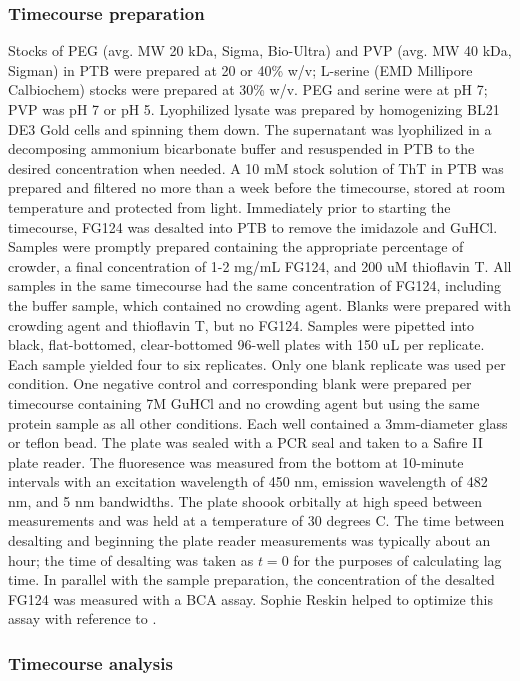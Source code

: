 \subsubsection{Timecourse preparation} Stocks of PEG (avg. MW 20 kDa, Sigma, Bio-Ultra) and PVP (avg. MW 40 kDa, Sigman) in PTB were prepared at 20 or 40\% w/v; L-serine (EMD Millipore Calbiochem) stocks were prepared at 30\% w/v.  PEG and serine were at pH 7; PVP was pH 7 or pH 5.  Lyophilized lysate was prepared by homogenizing BL21 DE3 Gold cells and spinning them down.  The supernatant was lyophilized in a decomposing ammonium bicarbonate buffer and resuspended in PTB to the desired concentration when needed.  A 10 mM stock solution of ThT in PTB was prepared and filtered no more than a week before the timecourse, stored at room temperature and protected from light.  Immediately prior to starting the timecourse, FG124 was desalted into PTB to remove the imidazole and GuHCl.  Samples were promptly prepared containing the appropriate percentage of crowder, a final concentration of 1-2 mg/mL FG124, and 200 uM thioflavin T.  All samples in the same timecourse had the same concentration of FG124, including the buffer sample, which contained no crowding agent.  Blanks were prepared with crowding agent and thioflavin T, but no FG124.  Samples were pipetted into black, flat-bottomed, clear-bottomed 96-well plates with 150 uL per replicate.  Each sample yielded four to six replicates.  Only one blank replicate was used per condition.  One negative control and corresponding blank were prepared per timecourse containing 7M GuHCl and no crowding agent but using the same protein sample as all other conditions.  Each well contained a 3mm-diameter glass or teflon bead.  The plate was sealed with a PCR seal and taken to a Safire II plate reader.  The fluoresence was measured from the bottom at 10-minute intervals with an excitation wavelength of 450 nm, emission wavelength of 482 nm, and 5 nm bandwidths.  The plate shoook orbitally at high speed between measurements and was held at a temperature of 30 degrees C.  The time between desalting and beginning the plate reader measurements was typically about an hour; the time of desalting was taken as $t=0$ for the purposes of calculating lag time. In parallel with the sample preparation, the concentration of the desalted FG124 was measured with a BCA assay.  Sophie Reskin helped to optimize this assay with reference to \cite{giehm10}.

\subsubsection{Timecourse analysis}

